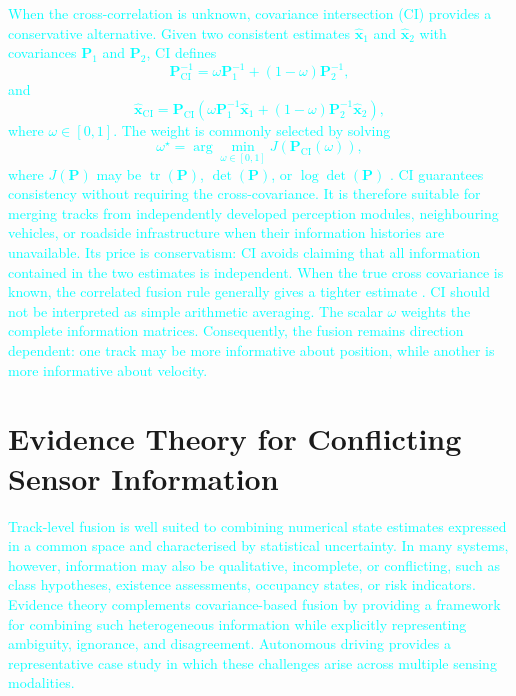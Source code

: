 \documentclass[11pt,oneside,openany]{book}
\newcommand{\TC}[1]{\textcolor{cyan}{#1}}
\begin{document}
\TC{When the cross-correlation is unknown, covariance intersection (CI)
provides a conservative alternative. Given two consistent estimates
$\widehat{\mathbf{x}}_{1}$ and $\widehat{\mathbf{x}}_{2}$ with covariances
$\mathbf{P}_{1}$ and $\mathbf{P}_{2}$, CI defines
\begin{equation}
\mathbf{P}_{\mathrm{CI}}^{-1}=\omega\mathbf{P}_{1}^{-1}+(1-\omega)\mathbf{P}_{2}^{-1},
\label{eq:ci-cov}
\end{equation}
and
\begin{equation}
\widehat{\mathbf{x}}_{\mathrm{CI}}=\mathbf{P}_{\mathrm{CI}}\left(\omega\mathbf{P}_{1}^{-1}\widehat{\mathbf{x}}_{1}+(1-\omega)\mathbf{P}_{2}^{-1}\widehat{\mathbf{x}}_{2}\right),
\label{eq:ci-est}
\end{equation}
where $\omega\in[0,1]$. The weight is commonly selected by solving
\begin{equation}
\omega^{\star}=\arg\min_{\omega\in[0,1]}J\!\left(\mathbf{P}_{\mathrm{CI}}(\omega)\right),
\label{eq:ci-weight}
\end{equation}
where $J(\mathbf{P})$ may be
$\operatorname{tr}(\mathbf{P})$,
$\det(\mathbf{P})$, or
$\log\det(\mathbf{P})$
\cite{uhlmann1995dynamic,julier1997nondivergent,julier2001general}. CI guarantees consistency without requiring the cross-covariance. It is therefore suitable for merging tracks from independently developed
perception modules, neighbouring vehicles, or roadside infrastructure when their information histories are unavailable. Its price is conservatism: CI avoids claiming that all information contained in the two estimates is independent. When the true cross covariance is known, the correlated fusion rule generally gives a tighter estimate \cite{barshalom2011tracking,julier2001general}. CI should not be interpreted as simple arithmetic averaging. The scalar
$\omega$ weights the complete information matrices. Consequently, the
fusion remains direction dependent: one track may be more informative
about position, while another is more informative about velocity.}



%
\section{Evidence Theory for Conflicting Sensor Information}
%

\TC{Track-level fusion is well suited to combining numerical state estimates expressed in a common space and characterised by statistical uncertainty. In many systems, however, information may also be qualitative, incomplete, or conflicting, such as class hypotheses, existence assessments, occupancy states, or risk indicators. Evidence theory complements covariance-based fusion by providing a framework for combining such heterogeneous information while explicitly representing ambiguity, ignorance, and disagreement. Autonomous driving provides a representative case study in which these challenges arise across multiple sensing modalities.}
\end{document}
